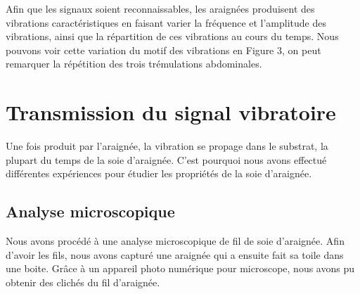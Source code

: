 Afin que les signaux soient reconnaissables, les araignées produisent
des vibrations caractéristiques en faisant varier la fréquence et
l'amplitude des vibrations, ainsi que la répartition de ces vibrations
au cours du temps. Nous pouvons voir cette variation du motif des
vibrations en Figure 3, on peut remarquer la répétition des trois
trémulations abdominales.

\section{Transmission du signal vibratoire}

Une fois produit par l'araignée, la vibration se propage dans le
substrat, la plupart du temps de la soie d'araignée. C'est pourquoi nous
avons effectué différentes expériences pour étudier les propriétés de la
soie d'araignée.

\subsection{Analyse microscopique}

Nous avons procédé à une analyse microscopique de fil de soie
d'araignée. Afin d'avoir les fils, nous avons capturé une araignée qui a
ensuite fait sa toile dans une boite. Grâce à un appareil photo
numérique pour microscope, nous avons pu obtenir des clichés du fil
d'araignée.

